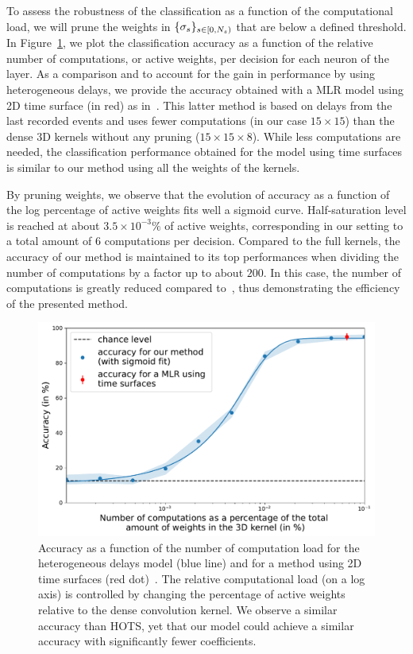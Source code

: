 \documentclass[default]{sn-jnl}%
\theoremstyle{thmstyleone}%
\theoremstyle{thmstyletwo}%
\theoremstyle{thmstylethree}%
\begin{document}
To assess the robustness of the classification as a function of the computational load, we will prune the weights in $\{\sigma_s\}_{s \in [0,N_{s})}$ that are below a defined threshold. In Figure~\ref{fig:accuracy}, we plot the classification accuracy as a function of the relative number of computations, or active weights, per decision for each neuron of the layer. As a comparison and to account for the gain in performance by using heterogeneous delays, we provide the accuracy obtained with a MLR model using 2D time surface (in red) as in~\citep{grimaldi_robust_2022}. This latter method is based on delays from the last recorded events and uses fewer computations (in our case $15\times15$) than the dense 3D kernels without any pruning ($15\times15\times8$). While less computations are needed, the classification performance obtained for the model using time surfaces is similar to our method using all the weights of the kernels.

By pruning weights, we observe that the evolution of accuracy as a function of the log percentage of active weights fits well a sigmoid curve. Half-saturation level is reached at about $3.5\times 10^{-3}\%$ of active weights, corresponding in our setting to a total amount of $6$ computations per decision. Compared to the full kernels, the accuracy of our method is maintained to its top performances when dividing the number of computations by a factor up to about $200$. In this case, the number of computations is greatly reduced compared to~\citep{grimaldi_robust_2022}, thus demonstrating the efficiency of the presented method. 

%
\begin{figure}[h!]
    \centering
    \includegraphics[width=0.95\linewidth]{figures/accuracy.pdf}
    \caption{Accuracy as a function of the number of computation load for the heterogeneous delays model (blue line) and for a method using 2D time surfaces (red dot)~\citep{grimaldi_robust_2022}. The relative computational load (on a log axis) is controlled by changing the percentage of active weights relative to the dense convolution kernel. We observe a similar accuracy than HOTS, yet that our model could achieve a similar accuracy with significantly fewer coefficients.}
    \label{fig:accuracy}
\end{figure}
\end{document}
